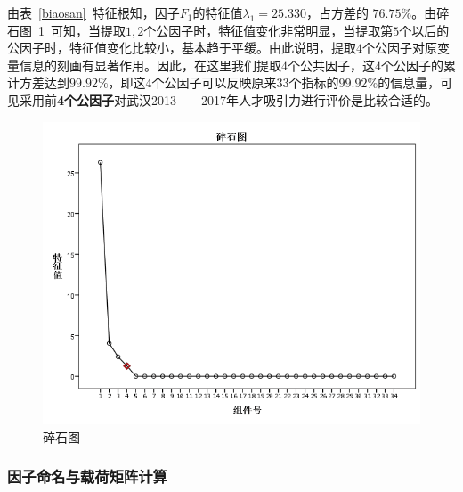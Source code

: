 \documentclass{whutmod}
\begin{document}
	
	由表~\ref{biaosan}~特征根知，因子$F_{1}$的特征值$\lambda_{1}=25.330$，占方差的 $76.75\%$。由碎石图~\ref{123}~可知，当提取$1,2$个公因子时，特征值变化非常明显，当提取第$5$个以后的公因子时，特征值变化比较小，基本趋于平缓。由此说明，提取$4$个公因子对原变量信息的刻画有显著作用。因此，在这里我们提取$4$个公共因子，这$4$个公因子的累计方差达到$99.92\%$，即这$4$个公因子可以反映原来$33$个指标的$99.92\%$的信息量，可见采用前\textbf{4个公因子}对武汉2013——2017年人才吸引力进行评价是比较合适的。
	
	\begin{figure}[H]
		\centering
		\includegraphics[width=\textwidth]{figures/123.png}
		\caption{碎石图}\label{123}
	\end{figure} 
	
	\subsubsection{因子命名与载荷矩阵计算}
\end{document}
